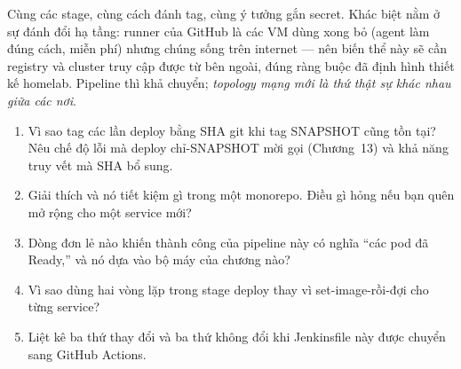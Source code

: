 Cùng các stage, cùng cách đánh tag, cùng ý tưởng gắn secret. Khác
biệt nằm ở sự đánh đổi hạ tầng: runner của GitHub là các VM dùng xong
bỏ (agent làm đúng cách, miễn phí) nhưng chúng sống trên internet ---
nên biến thể này sẽ cần registry và cluster truy cập được từ bên
ngoài, đúng ràng buộc đã định hình thiết kế homelab. Pipeline thì
khả chuyển; \emph{topology mạng mới là thứ thật sự khác nhau giữa các
nơi}.

\begin{quiz}
\begin{enumerate}
  \item Vì sao tag các lần deploy bằng SHA git khi tag SNAPSHOT cũng
  tồn tại? Nêu chế độ lỗi mà deploy chỉ-SNAPSHOT mời gọi (Chương~13)
  và khả năng truy vết mà SHA bổ sung.
  \item Giải thích  và nó tiết kiệm gì trong một
  monorepo. Điều gì hỏng nếu bạn quên mở rộng  cho một
  service mới?
  \item Dòng đơn lẻ nào khiến thành công của pipeline này có nghĩa
  ``các pod đã Ready,'' và nó dựa vào bộ máy của chương nào?
  \item Vì sao dùng hai vòng lặp trong stage deploy thay vì
  set-image-rồi-đợi cho từng service?
  \item Liệt kê ba thứ thay đổi và ba thứ không đổi khi Jenkinsfile
  này được chuyển sang GitHub Actions.
\end{enumerate}
\end{quiz}
